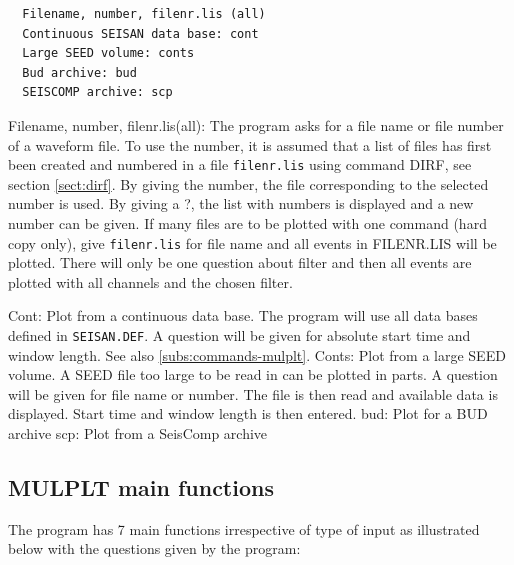 
\begin{verbatim}
  Filename, number, filenr.lis (all)
  Continuous SEISAN data base: cont
  Large SEED volume: conts
  Bud archive: bud
  SEISCOMP archive: scp
\end{verbatim}

Filename, number, filenr.lis(all): The program asks for a file name 
or file number of a waveform file. To use the 
number, it is assumed that a list of files has first been created 
and numbered in a file \texttt{filenr.lis} using command DIRF, see 
section \ref{sect:dirf}. By giving the number, the file corresponding to the 
selected number is used. By giving a ?, the list with numbers is displayed and a new number can be given. If many files are to be plotted with one command (hard copy only), give \texttt{filenr.lis} for file name and all events in FILENR.LIS will be plotted. There will only be one question about filter and then all events are plotted with all channels and the chosen filter. 

Cont: Plot from a continuous data base. The program will use all data 
bases defined in \texttt{SEISAN.DEF}. A question will be given for 
absolute start time and window length. See also \ref{subs:commands-mulplt}. 
Conts: Plot from a large SEED volume. A SEED file too large to be read in can be plotted in parts. A question will be given for file name or number. The file is then read and available data is displayed. Start time and window length is then entered.\newline
bud: Plot for a BUD archive\newline
scp: Plot from a SeisComp archive

\subsection{MULPLT main functions}
\label{subs:mulplt-main}

The program has 7 main functions irrespective of type of input as illustrated below with the questions given by the program: 



